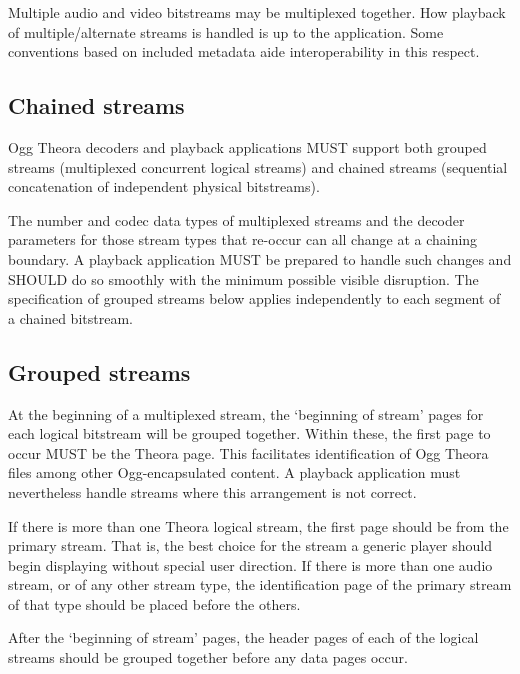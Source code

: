 \documentclass[9pt,letterpaper]{book}
\numberwithin{equation}{chapter}
\numberwithin{figure}{chapter}
\numberwithin{table}{chapter}
\begin{document}
Multiple audio and video bitstreams may be multiplexed together.
How playback of multiple/alternate streams is handled is up to the
 application.
Some conventions based on included metadata aide interoperability
 in this respect.

\subsection{Chained streams}

Ogg Theora decoders and playback applications MUST support both grouped
 streams (multiplexed concurrent logical streams) and chained streams
 (sequential concatenation of independent physical bitstreams).

The number and codec data types of multiplexed streams and the decoder
 parameters for those stream types that re-occur can all change at a
 chaining boundary.
A playback application MUST be prepared to handle such changes and
 SHOULD do so smoothly with the minimum possible visible disruption.
The specification of grouped streams below applies independently to each
 segment of a chained bitstream.

\subsection{Grouped streams}

At the beginning of a multiplexed stream, the `beginning of stream'
 pages for each logical bitstream will be grouped together.
Within these, the first page to occur MUST be the Theora page.
This facilitates identification of Ogg Theora files among other
 Ogg-encapsulated content.
A playback application must nevertheless handle streams where this
 arrangement is not correct.

If there is more than one Theora logical stream, the first page should
 be from the primary stream.
That is, the best choice for the stream a generic player should begin
 displaying without special user direction.
If there is more than one audio stream, or of any other stream
 type, the identification page of the primary stream of that type
 should be placed before the others.

After the `beginning of stream' pages, the header pages of each of
 the logical streams should be grouped together before any data pages
 occur.
\end{document}
